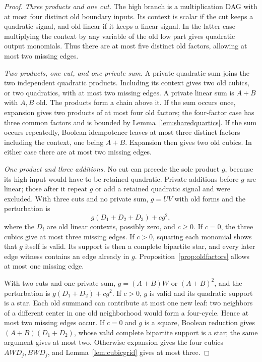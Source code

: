 \documentclass[11pt]{article}
\theoremstyle{definition}
\theoremstyle{remark}
\begin{document}
\begin{proof}
\emph{Three products and one cut.} The high branch is a multiplication DAG with at most four distinct old boundary inputs. Its context is scalar if the cut keeps a quadratic signal, and old linear if it keeps a linear signal. In the latter case multiplying the context by any variable of the old low part gives quadratic output monomials. Thus there are at most five distinct old factors, allowing at most two missing edges.

\emph{Two products, one cut, and one private sum.} A private quadratic sum joins the two independent quadratic products. Including its context gives two old cubics, or two quadratics, with at most two missing edges. A private linear sum is $A+B$ with $A,B$ old. The products form a chain above it. If the sum occurs once, expansion gives two products of at most four old factors; the four-factor case has three common factors and is bounded by Lemma~\ref{lem:sharedquartics}. If the sum occurs repeatedly, Boolean idempotence leaves at most three distinct factors including the context, one being $A+B$. Expansion then gives two old cubics. In either case there are at most two missing edges.

\emph{One product and three additions.} No cut can precede the sole product $g$, because its high input would have to be retained quadratic. Private additions before $g$ are linear; those after it repeat $g$ or add a retained quadratic signal and were excluded. With three cuts and no private sum, $g=UV$ with old forms and the perturbation is
\[
 g(D_1+D_2+D_3)+c g^2,
\]
where the $D_i$ are old linear contexts, possibly zero, and $c\ge0$. If $c=0$, the three cubics give at most three missing edges. If $c>0$, squaring each monomial shows that $g$ itself is valid. Its support is then a complete bipartite star, and every later edge witness contains an edge already in $g$. Proposition~\ref{prop:oldfactors} allows at most one missing edge.

With two cuts and one private sum, $g=(A+B)W$ or $(A+B)^2$, and the perturbation is $g(D_1+D_2)+c g^2$. If $c>0$, $g$ is valid and its quadratic support is a star. Each old summand can contribute at most one new leaf: two neighbors of a different center in one old neighborhood would form a four-cycle. Hence at most two missing edges occur. If $c=0$ and $g$ is a square, Boolean reduction gives $(A+B)(D_1+D_2)$, whose valid complete bipartite support is a star; the same argument gives at most two. Otherwise expansion gives the four cubics $AWD_j,BWD_j$, and Lemma~\ref{lem:cubicgrid} gives at most three.


\end{proof}
\end{document}

